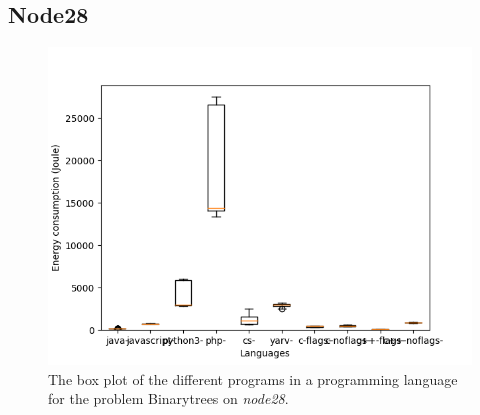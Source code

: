 \begin{appendices}
	
\chapter{Node28}
\label{app:node28}
\begin{figure}[h]
    \centering
    \includegraphics[width=.6\textwidth]{graphs/binarytrees_BOXoverview3.png}
    \caption{The box plot of the different programs in a programming language for the problem Binarytrees on \textit{node28}.}
    \label{fig:box-binarytrees3}
\end{figure}

\begin{table}[h]
\centering
{}
\caption{The comparison of the different languages for the Binarytrees problem on \textit{node28}. A \textit{+} means that the language on the row has a lower energy consumption then the language on the column, the opposite for \textit{-}.}
\label{tab:lang-binarytrees3}
\end{table}


\end{appendices}
